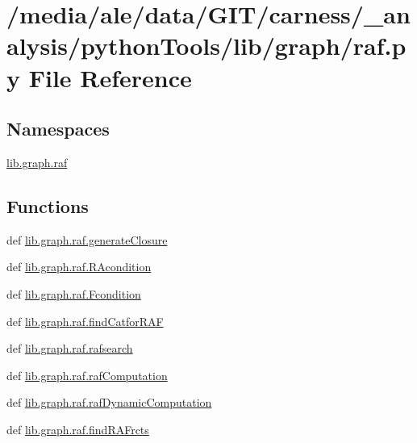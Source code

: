 \hypertarget{a00054}{\section{/media/ale/data/\-G\-I\-T/carness/\-\_\-analysis/python\-Tools/lib/graph/raf.py File Reference}
\label{a00054}
}
\subsection*{Namespaces}
\begin{DoxyCompactItemize}
\item 
\hyperlink{a00110}{lib.\-graph.\-raf}
\end{DoxyCompactItemize}
\subsection*{Functions}
\begin{DoxyCompactItemize}
\item 
def \hyperlink{a00110_a56510e9067d8a6c8f90847d6656ce709}{lib.\-graph.\-raf.\-generate\-Closure}
\item 
def \hyperlink{a00110_a9896a4198e08978afb80e86697f1bbd0}{lib.\-graph.\-raf.\-R\-Acondition}
\item 
def \hyperlink{a00110_a160a90fb55ff323fc86fcdc65b30b90f}{lib.\-graph.\-raf.\-Fcondition}
\item 
def \hyperlink{a00110_aaeb3a479f24daf493cc7052aef879d2c}{lib.\-graph.\-raf.\-find\-Catfor\-R\-A\-F}
\item 
def \hyperlink{a00110_a532a434a0b2fe187a3ff5a8319e4e3b4}{lib.\-graph.\-raf.\-rafsearch}
\item 
def \hyperlink{a00110_a3c9606e9d3274506955225eacf05877e}{lib.\-graph.\-raf.\-raf\-Computation}
\item 
def \hyperlink{a00110_a0b49d65e78e62c4ddd5022d4405f8286}{lib.\-graph.\-raf.\-raf\-Dynamic\-Computation}
\item 
def \hyperlink{a00110_aa4fb376eecb97a88efdb35aa15466c3b}{lib.\-graph.\-raf.\-find\-R\-A\-Frcts}
\end{DoxyCompactItemize}
